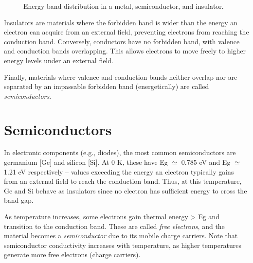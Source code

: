 \begin{figure}[H]
	\centering
	\caption{Energy band distribution in a metal, semiconductor, and insulator.}
	\label{fig:energyband}
\end{figure}

Insulators are materials where the forbidden band is wider than the energy an electron can acquire from an external field, preventing electrons from reaching the conduction band. Conversely, conductors have no forbidden band, with valence and conduction bands overlapping. This allows electrons to move freely to higher energy levels under an external field.

Finally, materials where valence and conduction bands neither overlap nor are separated by an impassable forbidden band (energetically) are called \emph{semiconductors}.
\section{Semiconductors}
In electronic components (e.g., diodes), the most common semiconductors are germanium [Ge] and silicon [Si]. At 0 K, these have Eg $\simeq$ 0.785 eV and Eg $\simeq$ 1.21 eV respectively – values exceeding the energy an electron typically gains from an external field to reach the conduction band. Thus, at this temperature, Ge and Si behave as insulators since no electron has sufficient energy to cross the band gap.  

As temperature increases, some electrons gain thermal energy > Eg and transition to the conduction band. These are called \emph{free electrons}, and the material becomes a \emph{semiconductor} due to its mobile charge carriers.  
Note that semiconductor conductivity increases with temperature, as higher temperatures generate more free electrons (charge carriers).

